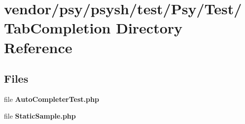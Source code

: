 \section{vendor/psy/psysh/test/\+Psy/\+Test/\+Tab\+Completion Directory Reference}
\label{dir_3c8a0e34e08cb8e51839869d409664be}
\subsection*{Files}
\begin{DoxyCompactItemize}
\item 
file {\bf Auto\+Completer\+Test.\+php}
\item 
file {\bf Static\+Sample.\+php}
\end{DoxyCompactItemize}
